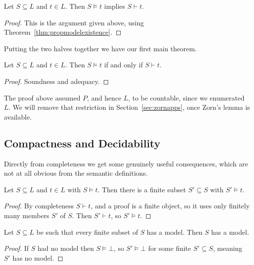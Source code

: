 \documentclass[a4paper]{scrartcl}
\begin{document}
\begin{corollary}[Adequacy]
  Let $S \subseteq L$ and $t \in L$. Then $S \models t$ implies $S \vdash t$.
\end{corollary}
\begin{proof}
  This is the argument given above, using Theorem~\ref{thm:propmodelexistence}.
\end{proof}

Putting the two halves together we have our first main theorem.

\begin{theorem}
  Let $S \subseteq L$ and $t \in L$. Then $S \models t$ if and only if $S \vdash t$.
\end{theorem}
\begin{proof}
  Soundness and adequacy.
\end{proof}

The proof above assumed $P$, and hence $L$, to be countable, since we enumerated $L$. We will remove that restriction in Section~\ref{sec:zornapps}, once Zorn's lemma is available.

\subsection{Compactness and Decidability}

Directly from completeness we get some genuinely useful consequences, which are not at all obvious from the semantic definitions.

\begin{theorem}
  Let $S \subseteq L$ and $t \in L$ with $S \models t$. Then there is a finite subset $S' \subseteq S$ with $S' \models t$.
\end{theorem}
\begin{proof}
  By completeness $S \vdash t$, and a proof is a finite object, so it uses only finitely many members $S'$ of $S$. Then $S' \vdash t$, so $S' \models t$.
\end{proof}

\begin{corollary}\label{cor:propcompactness}
  Let $S \subseteq L$ be such that every finite subset of $S$ has a model. Then $S$ has a model.
\end{corollary}
\begin{proof}
  If $S$ had no model then $S \models \bot$, so $S' \models \bot$ for some finite $S' \subseteq S$, meaning $S'$ has no model.
\end{proof}
\end{document}
